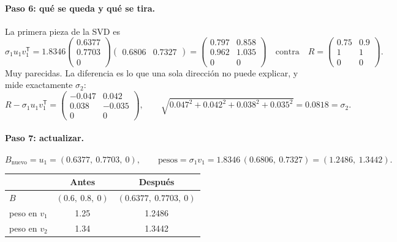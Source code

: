 \documentclass[11pt,letterpaper]{article}
\newcommand{\T}{^{\mathsf{T}}}
\newcommand{\raiz}[1]{\sqrt{#1}}
\begin{document}
\paragraph{Paso 6: qué se queda y qué se tira.} La primera pieza de la
SVD es
\[
    \sigma_1 u_1 v_1\T
    = 1.8346
      \begin{pmatrix} 0.6377 \\ 0.7703 \\ 0 \end{pmatrix}
      \begin{pmatrix} 0.6806 & 0.7327 \end{pmatrix}
    = \begin{pmatrix} 0.797 & 0.858 \\ 0.962 & 1.035 \\ 0 & 0
      \end{pmatrix}
    \quad\text{contra}\quad
    R = \begin{pmatrix} 0.75 & 0.9 \\ 1 & 1 \\ 0 & 0 \end{pmatrix} .
\]
Muy parecidas. La diferencia es lo que una sola dirección no puede
explicar, y mide exactamente $\sigma_2$:
\[
    R - \sigma_1 u_1 v_1\T =
    \begin{pmatrix} -0.047 & 0.042 \\ 0.038 & -0.035 \\ 0 & 0
    \end{pmatrix},
    \qquad
    \raiz{0.047^2 + 0.042^2 + 0.038^2 + 0.035^2} = 0.0818 = \sigma_2 .
\]

\paragraph{Paso 7: actualizar.}
\[
    B_{\text{nuevo}} = u_1 = (0.6377,\ 0.7703,\ 0),
    \qquad
    \text{pesos} = \sigma_1 v_1 = 1.8346\,(0.6806,\ 0.7327)
                 = (1.2486,\ 1.3442) .
\]

\begin{center}
\begin{tabular}{lcc}
    \toprule
                     & \textbf{Antes} & \textbf{Después} \\
    \midrule
    $B$              & $(0.6,\ 0.8,\ 0)$ & $(0.6377,\ 0.7703,\ 0)$ \\
    peso en $v_1$    & 1.25              & 1.2486 \\
    peso en $v_2$    & 1.34              & 1.3442 \\
    \bottomrule
\end{tabular}
\end{center}
\end{document}
